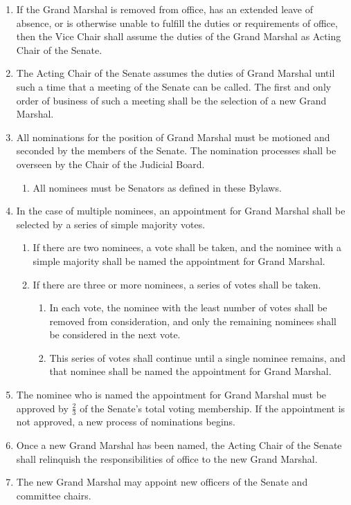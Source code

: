 \begin{enumerate}
\item If the Grand Marshal is removed from office, has an extended leave of absence, or is otherwise unable to fulfill the duties or
requirements of office, then the Vice Chair shall assume the duties of the Grand Marshal as Acting Chair of the Senate.
\item The Acting Chair of the Senate assumes the duties of Grand Marshal until such a time that a meeting of the Senate can be
called. The first and only order of business of such a meeting shall be the selection of a new Grand Marshal.
\item All nominations for the position of Grand Marshal must be motioned and seconded by the members of the Senate. The
nomination processes shall be overseen by the Chair of the Judicial Board.
\begin{enumerate}
\item All nominees must be Senators as defined in these Bylaws.
\end{enumerate}
\item In the case of multiple nominees, an appointment for Grand Marshal shall be selected by a series of simple majority votes.
\begin{enumerate}
\item If there are two nominees, a vote shall be taken, and the nominee with a simple majority shall be named the appointment
for Grand Marshal.
\item If there are three or more nominees, a series of votes shall be taken. 
\begin{enumerate}
\item In each vote, the nominee with the least number of votes shall be removed from consideration, and only the remaining
nominees shall be considered in the next vote.
\item This series of votes shall continue until a single nominee remains, and that nominee shall be named the appointment for
Grand Marshal.
\end{enumerate}
\end{enumerate}

\item The nominee who is named the appointment for Grand Marshal must be approved by $\frac{2}{3}$ of the Senate’s total voting
membership. If the appointment is not approved, a new process of nominations begins.
\item Once a new Grand Marshal has been named, the Acting Chair of the Senate shall relinquish the responsibilities of office to the
new Grand Marshal.
\item The new Grand Marshal may appoint new officers of the Senate and committee chairs.

\end{enumerate}